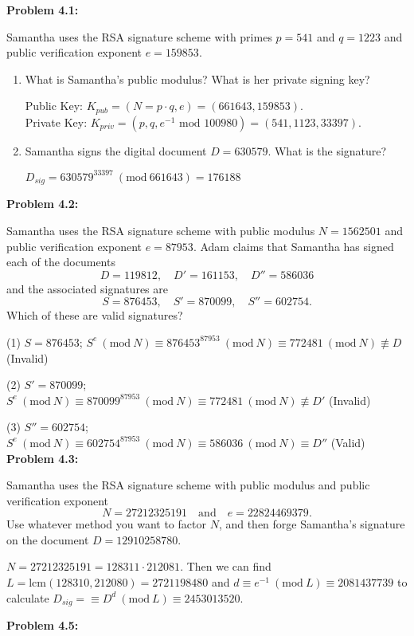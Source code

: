 \documentclass[a4paper, 11pt]{article}
\newcommand{\Mod}[1]{\ (\mathrm{mod}\ #1)}
\begin{document}
\noindent\textbf{Problem 4.1:}
    
    Samantha uses the RSA signature scheme with primes $p=541$ and $q=1223$ and public verification exponent $e=159853$.
    \begin{enumerate}[label=(\alph*)]
        \item What is Samantha's public modulus? What is her private signing key?
        
        Public Key: $K_{pub} = (N=p\cdot q,e) = (661643,159853).$\\
        Private Key: $K_{priv} = (p,q,e^{-1} \text{ mod } 100980) = (541,1123,33397).$
        \item Samantha signs the digital document $D=630579.$ What is the signature?
        
        $D_{sig} = 630579^{33397}\Mod{661643} = 176188$
    \end{enumerate}
    
\noindent\textbf{Problem 4.2:}
    
    Samantha uses the RSA signature scheme with public modulus $N=1562501$ and public verification exponent $e=87953$. Adam claims that Samantha has signed each of the documents $$D=119812, \quad D'=161153, \quad D''=586036$$ and the associated signatures are $$S=876453, \quad S'=870099, \quad S''=602754.$$ Which of these are valid signatures?
    
    (1) $S=876453$; $S^e \Mod{N} \equiv 876453^{87953} \Mod{N} \equiv 772481 \Mod{N} \not\equiv D$ (Invalid)
    
    (2) $S'=870099$; $S^e \Mod{N} \equiv 870099^{87953} \Mod{N} \equiv 772481 \Mod{N} \not\equiv D'$ (Invalid)
    
    (3) $S''=602754$; $S^e \Mod{N} \equiv 602754^{87953} \Mod{N} \equiv 586036 \Mod{N} \equiv D''$ (Valid)\\
    
\noindent\textbf{Problem 4.3:}
    
    Samantha uses the RSA signature scheme with public modulus and public verification exponent $$
    N = 27212325191 \quad\text{and}\quad e = 22824469379.$$ Use whatever method you want to factor $N$, and then forge Samantha’s signature on the document $D = 12910258780.$
    
    $N = 27212325191 = 128311\cdot212081$. Then we can find $L=\text{lcm}(128310,212080)=2721198480$ and $d\equiv e^{-1}\Mod{L} \equiv 2081437739$ to calculate $D_{sig} =\equiv D^d\Mod{L} \equiv 2453013520.$
    
\noindent\textbf{Problem 4.5:}
    
\end{document}
